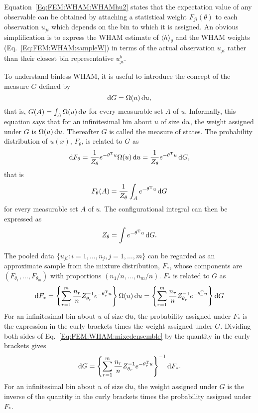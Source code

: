 Equation~\ref{Eq:FEM:WHAM:WHAMhu2} states that the expectation value of any observable can be obtained by attaching a statistical weight $F_{ji}(\theta)$ to each observation $u_{ji}$ which depends on the bin to which it is assigned. An obvious simplification is to express the WHAM estimate of $\langle h\rangle_\theta$ and the WHAM weights (Eq.~\ref{Eq:FEM:WHAM:sampleW}) in terms of the actual observation $u_{ji}$ rather than their closest bin representative $u_{ji}^b$.

To understand binless WHAM, it is useful to introduce the concept of the measure $G$ defined by
\begin{equation}
    \mathop{}\!\mathrm{d} G=\Omega(u)\mathop{}\!\mathrm{d} u,
\end{equation}
that is, $G(A)=\int_A\Omega(u)\mathop{}\!\mathrm{d} u$ for every measurable set $A$ of $u$. Informally, this equation says that for an infinitesimal bin about $u$ of size $\mathop{}\!\mathrm{d} u$, the weight assigned under $G$ is $\Omega(u)\mathop{}\!\mathrm{d} u$. Thereafter $G$ is called the measure of states. The probability distribution of $u(x)$, $F_\theta$, is related to $G$ as
\begin{equation}
    \mathop{}\!\mathrm{d} F_\theta=\frac{1}{Z_\theta}e^{-\theta^\mathrm{T}u}\Omega(u)\mathop{}\!\mathrm{d} u=\frac{1}{Z_\theta}e^{-\theta^\mathrm{T}u}\mathop{}\!\mathrm{d} G,
\end{equation}
that is
\begin{equation}
    F_\theta(A)=\frac{1}{Z_\theta}\int_A e^{-\theta^\mathrm{T}u}\mathop{}\!\mathrm{d} G
\end{equation}
for every measurable set $A$ of $u$. The configurational integral can then be expressed as
\begin{equation}
    Z_\theta=\int e^{-\theta^\mathrm{T}u}\mathop{}\!\mathrm{d} G.
\end{equation}

The pooled data $\{u_{ji}: i=1,\dots,n_j, j=1,\dots,m\}$ can be regarded as an approximate sample from the mixture distribution, $F_\ast$, whose components are $(F_{\theta_1},\dots,F_{\theta_m})$ with proportions $(n_1/n,\dots,n_m/n)$. $F_\ast$ is related to $G$ as 
\begin{equation}
    \mathop{}\!\mathrm{d} F_\ast=\left\{\sum_{r=1}^m\frac{n_r}{n}Z_{\theta_r}^{-1} e^{-\theta_r^{\mathrm{T}}u} \right\}\Omega(u)\mathop{}\!\mathrm{d} u=\left\{\sum_{r=1}^m\frac{n_r}{n}Z_{\theta_r}^{-1} e^{-\theta_r^{\mathrm{T}}u} \right\}\mathop{}\!\mathrm{d} G
    \label{Eq:FEM:WHAM:mixedensemble}
\end{equation}
For an infinitesimal bin about $u$ of size $\mathop{}\!\mathrm{d} u$, the probability assigned under $F_\ast$ is the expression in the curly brackets times the weight assigned under $G$. Dividing both sides of Eq.~\ref{Eq:FEM:WHAM:mixedensemble} by the quantity in the curly brackets  gives
\begin{equation}
    \mathop{}\!\mathrm{d} G=\left\{\sum_{r=1}^m\frac{n_r}{n}Z_{\theta_r}^{-1} e^{-\theta_r^{\mathrm{T}}u} \right\}^{-1}\mathop{}\!\mathrm{d} F_\ast.
    \label{Eq:FEM:WHAM:GofF}
\end{equation}
For an infinitesimal bin about $u$ of size $\mathop{}\!\mathrm{d} u$, the weight assigned under $G$ is the inverse of the quantity in the curly brackets times the probability assigned under $F_\ast$.

